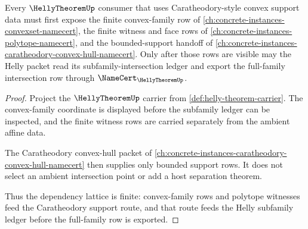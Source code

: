\begin{lemma}
\label{lem:helly-theorem-caratheodory-helly-dependency-route}
Every $\HellyTheoremUp$ consumer that uses Caratheodory-style convex support data must first expose the finite convex-family row of \autoref{ch:concrete-instances-convexset-namecert}, the finite witness and face rows of \autoref{ch:concrete-instances-polytope-namecert}, and the bounded-support handoff of \autoref{ch:concrete-instances-caratheodory-convex-hull-namecert}. Only after those rows are visible may the Helly packet read its subfamily-intersection ledger and export the full-family intersection row through $\NameCert_{\HellyTheoremUp}$.
\end{lemma}
\begin{proof}
Project the $\HellyTheoremUp$ carrier from \autoref{def:helly-theorem-carrier}. The convex-family coordinate is displayed before the subfamily ledger can be inspected, and the finite witness rows are carried separately from the ambient affine data.

The Caratheodory convex-hull packet of \autoref{ch:concrete-instances-caratheodory-convex-hull-namecert} then supplies only bounded support rows. It does not select an ambient intersection point or add a host separation theorem.

Thus the dependency lattice is finite: convex-family rows and polytope witnesses feed the Caratheodory support route, and that route feeds the Helly subfamily ledger before the full-family row is exported.
\end{proof}
